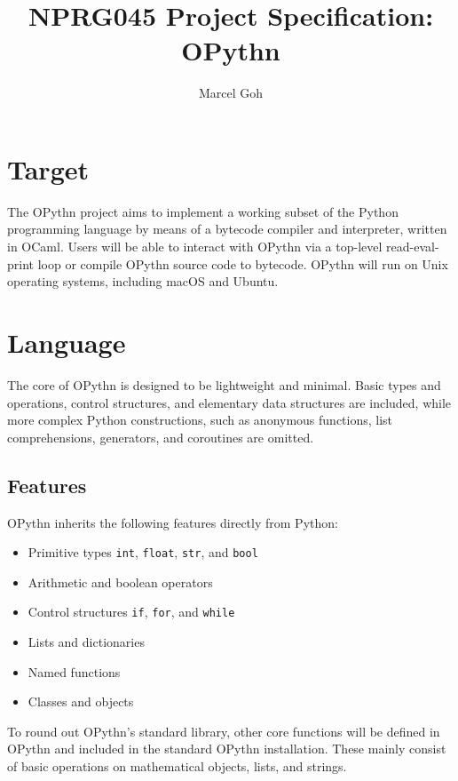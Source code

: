 \documentclass[11pt, twoside]{article}
\newcommand{\ms}{\texttt}
\begin{document}
\title{\Huge{\textbf{NPRG045 Project Specification: OPythn}}}
\author{\Large{Marcel Goh}}
\clearpage\maketitle
\thispagestyle{empty}
\newpage
\setcounter{page}{1}

\section{Target}
    The OPythn project aims to implement a working subset of the Python programming language by means of a bytecode compiler and interpreter, written in OCaml. Users will be able to interact with OPythn via a top-level read-eval-print loop or compile OPythn source code to bytecode. OPythn will run on Unix operating systems, including macOS and Ubuntu.

\section{Language}
    The core of OPythn is designed to be lightweight and minimal. Basic types and operations, control structures, and elementary data structures are included, while more complex Python constructions, such as anonymous functions, list comprehensions, generators, and coroutines are omitted.
    \subsection{Features}
    OPythn inherits the following features directly from Python:
    \begin{itemize}
        \item Primitive types \ms{int}, \ms{float}, \ms{str}, and \ms{bool}
        \item Arithmetic and boolean operators
        \item Control structures \ms{if}, \ms{for}, and \ms{while}
        \item Lists and dictionaries
        \item Named functions
        \item Classes and objects
    \end{itemize}
    To round out OPythn's standard library, other core functions will be defined in OPythn and included in the standard OPythn installation. These mainly consist of basic operations on mathematical objects, lists, and strings.
\end{document}
